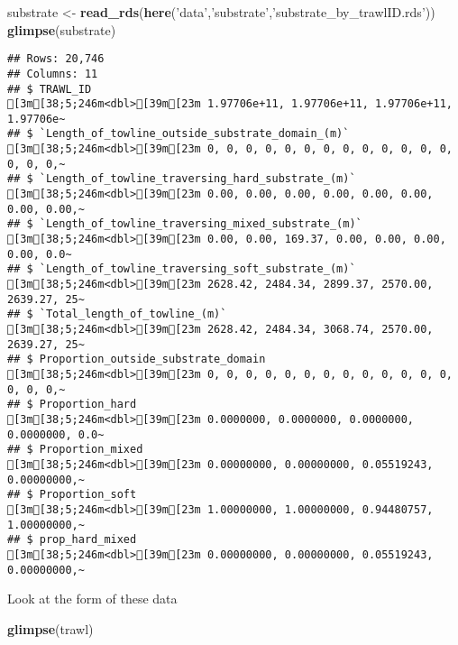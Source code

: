 \documentclass[
]{article}
\newenvironment{Shaded}{\begin{snugshade}}{\end{snugshade}}
\newcommand{\KeywordTok}[1]{\textcolor[rgb]{0.13,0.29,0.53}{\textbf{#1}}}
\newcommand{\NormalTok}[1]{#1}
\newcommand{\StringTok}[1]{\textcolor[rgb]{0.31,0.60,0.02}{#1}}
\begin{document}
\begin{Shaded}
\begin{Highlighting}[]
\NormalTok{substrate <-}\StringTok{ }\KeywordTok{read_rds}\NormalTok{(}\KeywordTok{here}\NormalTok{(}\StringTok{'data'}\NormalTok{,}\StringTok{'substrate'}\NormalTok{,}\StringTok{'substrate_by_trawlID.rds'}\NormalTok{))}
\KeywordTok{glimpse}\NormalTok{(substrate)}
\end{Highlighting}
\end{Shaded}

\begin{verbatim}
## Rows: 20,746
## Columns: 11
## $ TRAWL_ID                                           [3m[38;5;246m<dbl>[39m[23m 1.97706e+11, 1.97706e+11, 1.97706e+11, 1.97706e~
## $ `Length_of_towline_outside_substrate_domain_(m)`   [3m[38;5;246m<dbl>[39m[23m 0, 0, 0, 0, 0, 0, 0, 0, 0, 0, 0, 0, 0, 0, 0, 0,~
## $ `Length_of_towline_traversing_hard_substrate_(m)`  [3m[38;5;246m<dbl>[39m[23m 0.00, 0.00, 0.00, 0.00, 0.00, 0.00, 0.00, 0.00,~
## $ `Length_of_towline_traversing_mixed_substrate_(m)` [3m[38;5;246m<dbl>[39m[23m 0.00, 0.00, 169.37, 0.00, 0.00, 0.00, 0.00, 0.0~
## $ `Length_of_towline_traversing_soft_substrate_(m)`  [3m[38;5;246m<dbl>[39m[23m 2628.42, 2484.34, 2899.37, 2570.00, 2639.27, 25~
## $ `Total_length_of_towline_(m)`                      [3m[38;5;246m<dbl>[39m[23m 2628.42, 2484.34, 3068.74, 2570.00, 2639.27, 25~
## $ Proportion_outside_substrate_domain                [3m[38;5;246m<dbl>[39m[23m 0, 0, 0, 0, 0, 0, 0, 0, 0, 0, 0, 0, 0, 0, 0, 0,~
## $ Proportion_hard                                    [3m[38;5;246m<dbl>[39m[23m 0.0000000, 0.0000000, 0.0000000, 0.0000000, 0.0~
## $ Proportion_mixed                                   [3m[38;5;246m<dbl>[39m[23m 0.00000000, 0.00000000, 0.05519243, 0.00000000,~
## $ Proportion_soft                                    [3m[38;5;246m<dbl>[39m[23m 1.00000000, 1.00000000, 0.94480757, 1.00000000,~
## $ prop_hard_mixed                                    [3m[38;5;246m<dbl>[39m[23m 0.00000000, 0.00000000, 0.05519243, 0.00000000,~
\end{verbatim}

Look at the form of these data

\begin{Shaded}
\begin{Highlighting}[]
\KeywordTok{glimpse}\NormalTok{(trawl)}
\end{Highlighting}
\end{Shaded}
\end{document}

